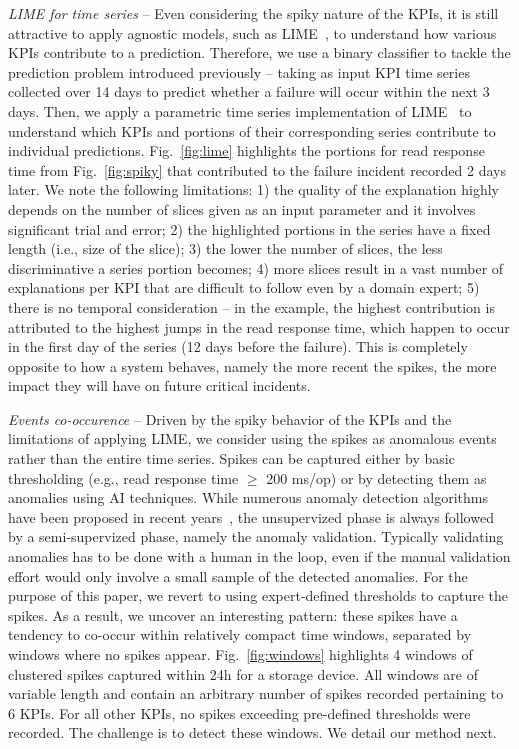 \documentclass[letterpaper]{article} %
\begin{document}
\textit{LIME for time series} -- Even considering the spiky nature of the KPIs, it is still attractive to apply agnostic models, such as LIME~\cite{lime}, to understand how various KPIs contribute to a prediction. Therefore, we use a binary classifier to tackle the prediction problem introduced previously -- taking as input KPI time series collected over 14 days to predict whether a failure will occur within the next 3 days. Then, we apply a parametric time series implementation of LIME~\cite{limets} to understand which KPIs and portions of their corresponding series contribute to individual predictions. Fig.~\ref{fig:lime} highlights the portions for read response time from Fig.~\ref{fig:spiky} that contributed to the failure incident recorded 2 days later. We note the following limitations: 1) the quality of the explanation highly depends on the number of slices given as an input parameter and it involves significant trial and error; 2) the highlighted portions in the series have a fixed length (i.e., size of the slice); 3) the lower the number of slices, the less discriminative a series portion becomes; 4) more slices result in a vast number of explanations per KPI that are difficult to follow even by a domain expert; 5) there is no temporal consideration -- in the example, the highest contribution is attributed to the highest jumps in the read response time, which happen to occur in the first day of the series (12 days before the failure). This is completely opposite to how a system behaves, namely the more recent the spikes, the more impact they will have on future critical incidents.


\textit{Events co-occurence} -- Driven by the spiky behavior of the KPIs and the limitations of applying LIME, we consider using the spikes as anomalous events rather than the entire time series. Spikes can be captured either by basic thresholding (e.g., read response time $\geq$ 200 ms/op) or by detecting them as anomalies using AI techniques. While numerous anomaly detection algorithms have been proposed in recent years~\cite{nemo,anomaly1,anomaly2}, the unsupervized phase is always followed by a semi-supervized phase, namely the anomaly validation. Typically validating anomalies has to be done with a human in the loop, even if the manual validation effort would only involve a small sample of the detected anomalies. For the purpose of this paper, we revert to using expert-defined thresholds to capture the spikes. As a result, we uncover an interesting pattern: these spikes have a tendency to co-occur within relatively compact time windows, separated by windows where no spikes appear. Fig.~\ref{fig:windows} highlights 4 windows of clustered spikes captured within 24h for a storage device. All windows are of variable length and contain an arbitrary number of spikes recorded pertaining to 6 KPIs. For all other KPIs, no spikes exceeding pre-defined thresholds were recorded. The challenge is to detect these windows. We detail our method next.
\end{document}
